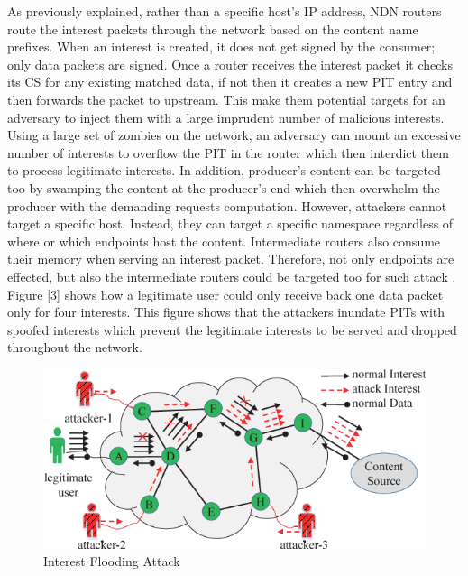 \documentclass[conference]{IEEEtran}
\begin{document}
As previously explained, rather than a specific host’s IP address, NDN routers route the interest packets through the network based on the content name prefixes. When an interest is created, it does not get signed by the consumer; only data packets are signed\cite{Gasti2013}. Once a router receives the interest packet it checks its CS for any existing matched data, if not then it creates a new PIT entry and then forwards the packet to upstream. This make them potential targets for an adversary to inject them with a large imprudent number of malicious interests. Using a large set of zombies on the network, an adversary can mount an excessive number of interests to overflow the PIT in the router which then interdict them to process legitimate interests. In addition, producer's content can be targeted too by swamping the content at the producer's end which then overwhelm the producer with the demanding requests computation. However, attackers cannot target a specific host. Instead, they can target a specific namespace regardless of where or which endpoints host the content. Intermediate routers also consume their memory when serving an interest packet. Therefore, not only endpoints are effected, but also the intermediate routers could be targeted too for such attack \cite{6663516}\cite{KARAMI20151262}. Figure [3] shows how a legitimate user could only receive back one data packet only for four interests. This figure shows that the attackers inundate PITs with spoofed interests which prevent the legitimate interests to be served and dropped throughout the network.  

\begin{figure} [ht]
    \centering
    \includegraphics[width=\columnwidth]{IFA.png}
    \caption{\small Interest Flooding Attack  \cite{Xin2016ANI} }
    \label{fig:my_label2}
\end{figure}
\end{document}
